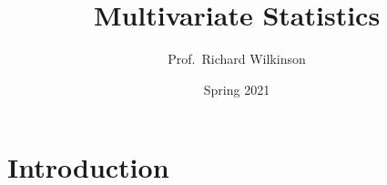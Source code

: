\documentclass[]{book}
\title{Multivariate Statistics}
\author{Prof.~Richard Wilkinson}
\date{Spring 2021}
\theoremstyle{definition}
\theoremstyle{definition}
\theoremstyle{definition}
\theoremstyle{remark}
\begin{document}
\maketitle

{
\setcounter{tocdepth}{1}
\tableofcontents
}
\hypertarget{introduction}{%
\chapter*{Introduction}\label{introduction}}

\newcommand{\tr}{\operatorname{tr}}
\newcommand{\indep}{\perp \!\!\! \perp}
\newcommand{\bY}{\boldsymbol Y}
\newcommand{\bx}{\boldsymbol x}
\newcommand{\bX}{\boldsymbol X}
\newcommand{\bH}{\boldsymbol H}
\newcommand{\by}{\boldsymbol y}
\newcommand{\bz}{\boldsymbol z}
\newcommand{\bS}{\boldsymbol S}
\newcommand{\bR}{\boldsymbol R}
\newcommand{\bF}{\boldsymbol F}
\newcommand{\bI}{\mathbf I}
\newcommand{\bmu}{\boldsymbol \mu}
\newcommand{\bSigma}{\boldsymbol \Sigma}
\newcommand{\bLambda}{\boldsymbol \Lambda}
\newcommand{\bgamma}{\boldsymbol \gamma}
\newcommand{\btheta}{\boldsymbol \theta}
\newcommand{\bdelta}{\boldsymbol \delta}
\newcommand{\bbeta}{\boldsymbol \beta}
\newcommand{\blambda}{\boldsymbol \lambda}
\newcommand{\bA}{\boldsymbol A}
\newcommand{\bB}{\boldsymbol B}
\newcommand{\bC}{\boldsymbol C}
\newcommand{\bD}{\boldsymbol D}
\newcommand{\bE}{\boldsymbol E}
\newcommand{\bG}{\boldsymbol G}
\newcommand{\bM}{\boldsymbol M}
\newcommand{\bP}{\boldsymbol P}
\newcommand{\bQ}{\boldsymbol Q}
\newcommand{\bT}{\boldsymbol T}
\newcommand{\bV}{\boldsymbol V}
\newcommand{\bU}{\boldsymbol U}
\newcommand{\bW}{\boldsymbol W}
\newcommand{\bZ}{\boldsymbol Z}

\newcommand{\ba}{\boldsymbol a}
\newcommand{\bb}{\boldsymbol b}
\newcommand{\bc}{\boldsymbol c}
\newcommand{\bd}{\boldsymbol d}
\newcommand{\be}{\boldsymbol e}
\newcommand{\bh}{\boldsymbol h}
\newcommand{\bk}{\boldsymbol k}
\newcommand{\bp}{\boldsymbol p}
\newcommand{\bq}{\boldsymbol q}
\newcommand{\br}{\boldsymbol r}
\newcommand{\bt}{{\boldsymbol t}}
\newcommand{\bu}{\boldsymbol u}
\newcommand{\bv}{\boldsymbol v}
\newcommand{\bw}{\boldsymbol w}
\newcommand{\bzero}{\boldsymbol 0}
\newcommand{\mR}{\mathbb R}
\newcommand{\cR}{\mathcal R}

\newcommand{\bs}{\boldsymbol}
\newcommand{\ds}{\displaystyle}
\newcommand{\tdiag}{\text{diag}}
\newcommand{\ttr}{\text{tr}}
\newcommand{\tmin}{\text{min}}
\newcommand{\tmax}{\text{max}}
\newcommand{\tdet}{\text{det}}
\end{document}
